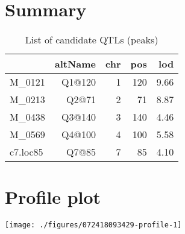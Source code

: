 \documentclass[a4paper,11pt]{article}\usepackage[]{graphicx}\usepackage[]{color}
\makeatletter
\def\maxwidth{ %
  \ifdim\Gin@nat@width>\linewidth
    \linewidth
  \else
    \Gin@nat@width
  \fi
}
\newenvironment{knitrout}{}{} %
\makeatother
\begin{document}
\section{Summary}
\begin{table}[ht]
\begin{flushleft}
\caption{List of candidate QTLs (peaks)} 
\label{summary}
\begin{tabular}{lrrrr}
  \hline
 & altName & chr & pos & lod \\ 
  \hline
M\_0121 & Q1@120 & 1 & 120 & 9.66 \\ 
  M\_0213 & Q2@71 & 2 & 71 & 8.87 \\ 
  M\_0438 & Q3@140 & 3 & 140 & 4.46 \\ 
  M\_0569 & Q4@100 & 4 & 100 & 5.58 \\ 
  c7.loc85 & Q7@85 & 7 & 85 & 4.10 \\ 
   \hline
\end{tabular}
\end{flushleft}
\end{table}

\newpage
\section{Profile plot}
\begin{knitrout}
\color{fgcolor}

\texttt{[image: ./figures/072418093429-profile-1]} \hfill{}



\end{knitrout}
\end{document}
